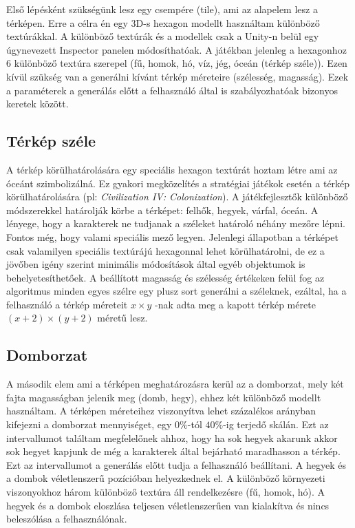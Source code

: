 Első lépésként szükségünk lesz egy csempére (tile), ami az alapelem lesz a térképen. Erre a célra én egy 3D-s hexagon modellt használtam különböző textúrákkal. A különböző textúrák és a modellek csak a Unity-n belül egy úgynevezett Inspector panelen módosíthatóak. A játékban jelenleg a hexagonhoz 6 különböző textúra szerepel (fű, homok, hó, víz, jég, óceán (térkép széle)).
\newline
\newline Ezen kívül szükség van a generálni kívánt térkép méreteire (szélesség, magasság). Ezek a paraméterek a generálás előtt a felhasználó által is szabályozhatóak bizonyos keretek között.

\subsection{Térkép széle}

A térkép körülhatárolására egy speciális hexagon textúrát hoztam létre ami az óceánt szimbolizálná. Ez gyakori megközelítés a stratégiai játékok esetén a térkép körülhatárolására (pl: \textit{Civilization IV: Colonization}). A játékfejlesztők különböző módszerekkel határolják körbe a térképet: felhők, hegyek, várfal, óceán. A lényege, hogy a karakterek ne tudjanak a széleket határoló néhány mezőre lépni. Fontos még, hogy valami speciális mező legyen.
\newline
\newline Jelenlegi állapotban a térképet csak valamilyen speciális textúrájú hexagonnal lehet körülhatárolni, de ez a jövőben igény szerint minimális módosítások által egyéb objektumok is behelyetesíthetőek. 
\newline
\newline A beállított magasság és szélesség értékeken felül fog az algoritmus minden egyes szélre egy plusz sort generálni a széleknek, ezáltal, ha a felhasználó a térkép méreteit $x \times y$ -nak adta meg a kapott térkép mérete $(x+2) \times (y+2)$ méretű lesz.

\subsection{Domborzat}

A második elem ami a térképen meghatározásra kerül az a domborzat, mely két fajta magasságban jelenik meg (domb, hegy), ehhez két különböző modellt használtam. A térképen méreteihez viszonyítva lehet százalékos arányban kifejezni a domborzat mennyiséget, egy $0\%$-tól $40\%$-ig terjedő skálán. Ezt az intervallumot találtam megfelelőnek ahhoz, hogy ha sok hegyek akarunk akkor sok hegyet kapjunk de még a karakterek által bejárható maradhasson a térkép. Ezt az intervallumot a generálás előtt tudja a felhasználó beállítani. A hegyek és a dombok véletlenszerű pozícióban helyezkednek el. A különböző környezeti viszonyokhoz három különböző textúra áll rendelkezésre (fű, homok, hó). A hegyek és a dombok eloszlása teljesen véletlenszerűen van kialakítva és nincs beleszólása a felhasználónak.

